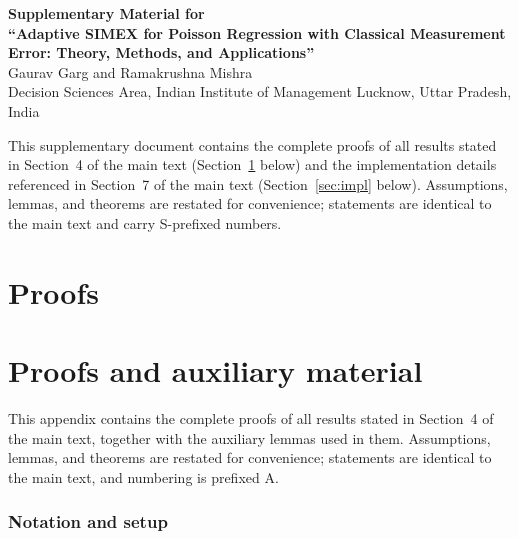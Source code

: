 \documentclass[11pt]{article}
\theoremstyle{plain}
\theoremstyle{definition}
\begin{document}
\begin{center}
{\Large\bfseries Supplementary Material for\\
``Adaptive SIMEX for Poisson Regression with Classical Measurement
Error: Theory, Methods, and Applications''}\\[6pt]
Gaurav Garg and Ramakrushna Mishra\\[4pt]
{\small Decision Sciences Area, Indian Institute of Management
Lucknow, Uttar Pradesh, India}
\end{center}

\bigskip

This supplementary document contains the complete proofs of all
results stated in Section~4 of the main text (Section~\ref{sec:proofs}
below) and the implementation details referenced in
Section~7 of the main text (Section~\ref{sec:impl} below).
Assumptions, lemmas, and theorems are restated for convenience;
statements are identical to the main text and carry S-prefixed
numbers.

\section{Proofs}\label{sec:proofs}

\section{Proofs and auxiliary material}\label{app:proofs}

This appendix contains the complete proofs of all results stated in
Section~4 of the main text, together with the auxiliary lemmas used in
them. Assumptions, lemmas, and theorems are restated for convenience;
statements are identical to the main text, and numbering is prefixed
A.

\subsubsection{Notation and setup}\label{app:sec:setup}
\end{document}
